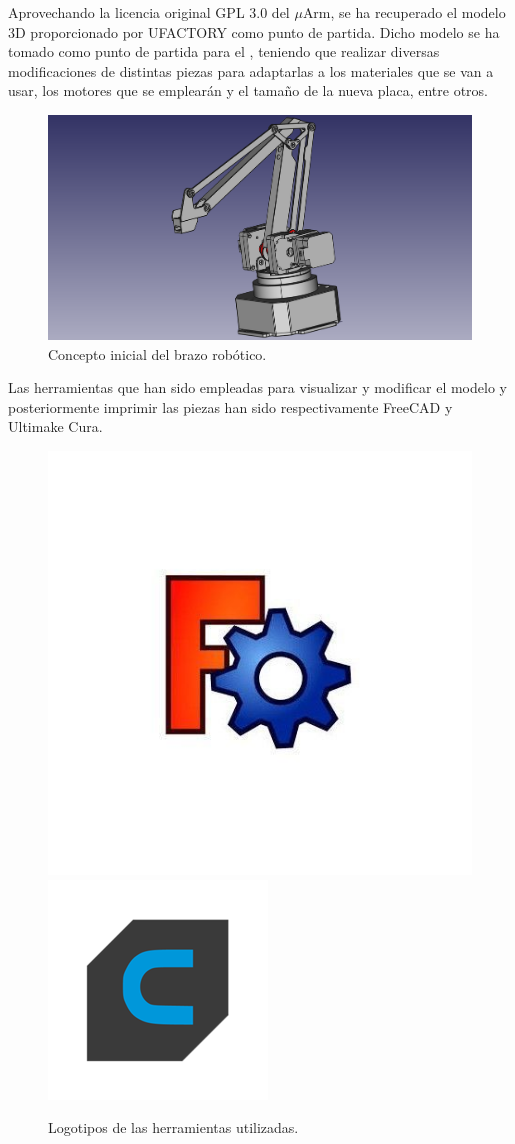 Aprovechando la licencia original GPL 3.0 del $\mu$Arm, se ha recuperado el modelo 3D proporcionado por UFACTORY como punto de partida. 
Dicho modelo se ha tomado como punto de partida para el \pArm{}, teniendo que realizar diversas
modificaciones de distintas piezas para adaptarlas a los materiales que se van a usar,
los motores que se emplearán y el tamaño de la nueva placa, entre otros.

\begin{figure}[H]
    \centering
    \includegraphics[width=.8\linewidth]{pictures/brazo_vista_3d_inicial.png}
    \caption{Concepto inicial del brazo robótico.}
    \label{fig:manipulador_inicial}
\end{figure}

Las herramientas que han sido empleadas para visualizar y modificar el modelo y posteriormente imprimir las piezas han sido respectivamente FreeCAD y Ultimake Cura.

\begin{figure}[H]
    \centering
    \includegraphics[width=.45\linewidth]{pictures/freeCAD.jpg}
    \hspace{1cm}
    \includegraphics[width=.40\linewidth]{pictures/Ultimaker_cura_logo.png}
    \caption{Logotipos de las herramientas utilizadas.}
    \label{fig:herramientas_3d}
\end{figure}

